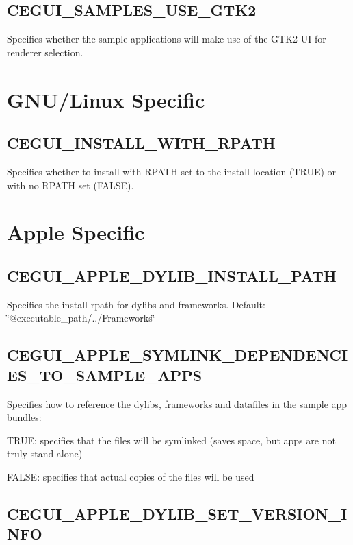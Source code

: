 \hypertarget{build_options_build_options_samples_use_gtk2}{}\subsection{C\+E\+G\+U\+I\+\_\+\+S\+A\+M\+P\+L\+E\+S\+\_\+\+U\+S\+E\+\_\+\+G\+T\+K2}\label{build_options_build_options_samples_use_gtk2}
Specifies whether the sample applications will make use of the G\+T\+K2 UI for renderer selection.\hypertarget{build_options_build_options_unix}{}\section{G\+N\+U/\+Linux Specific}\label{build_options_build_options_unix}
\hypertarget{build_options_build_options_install_rpath}{}\subsection{C\+E\+G\+U\+I\+\_\+\+I\+N\+S\+T\+A\+L\+L\+\_\+\+W\+I\+T\+H\+\_\+\+R\+P\+A\+TH}\label{build_options_build_options_install_rpath}
Specifies whether to install with R\+P\+A\+TH set to the install location (T\+R\+UE) or with no R\+P\+A\+TH set (F\+A\+L\+SE).\hypertarget{build_options_build_options_apple}{}\section{Apple Specific}\label{build_options_build_options_apple}
\hypertarget{build_options_build_options_dylib_install_path}{}\subsection{C\+E\+G\+U\+I\+\_\+\+A\+P\+P\+L\+E\+\_\+\+D\+Y\+L\+I\+B\+\_\+\+I\+N\+S\+T\+A\+L\+L\+\_\+\+P\+A\+TH}\label{build_options_build_options_dylib_install_path}
Specifies the install rpath for dylibs and frameworks. Default\+: \char`\"{}@executable\+\_\+path/../\+Frameworks\char`\"{} \hypertarget{build_options_build_options_symlink_apple_deps}{}\subsection{C\+E\+G\+U\+I\+\_\+\+A\+P\+P\+L\+E\+\_\+\+S\+Y\+M\+L\+I\+N\+K\+\_\+\+D\+E\+P\+E\+N\+D\+E\+N\+C\+I\+E\+S\+\_\+\+T\+O\+\_\+\+S\+A\+M\+P\+L\+E\+\_\+\+A\+P\+PS}\label{build_options_build_options_symlink_apple_deps}
Specifies how to reference the dylibs, frameworks and datafiles in the sample app bundles\+:
\begin{DoxyItemize}
\item T\+R\+UE\+: specifies that the files will be symlinked (saves space, but apps are not truly stand-\/alone)
\item F\+A\+L\+SE\+: specifies that actual copies of the files will be used 
\end{DoxyItemize}\hypertarget{build_options_build_options_set_dylib_version}{}\subsection{C\+E\+G\+U\+I\+\_\+\+A\+P\+P\+L\+E\+\_\+\+D\+Y\+L\+I\+B\+\_\+\+S\+E\+T\+\_\+\+V\+E\+R\+S\+I\+O\+N\+\_\+\+I\+N\+FO}\label{build_options_build_options_set_dylib_version}
